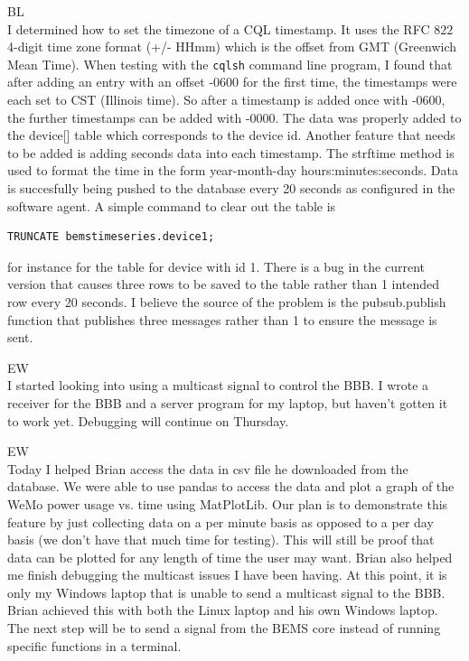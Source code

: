 \documentclass[fontsize=11pt, %
                             paper=letter, %
                             openany, %
                             captions=tableheading,
                             index=totoc,
                             hyperref]{labbook}
\begin{document}
BL\\
I determined how to set the timezone of a CQL timestamp. It uses the RFC $822$ 4-digit time zone format (+/- HHmm) which is the offset from GMT (Greenwich Mean Time). When testing with the \texttt{cqlsh} command line program, I found that after adding an entry with an offset -0600 for the first time, the timestamps were each set to CST (Illinois time). So after a timestamp is added once with -0600, the further timestamps can be added with -0000. The data was properly added to the device[\*] table which corresponds to the device id. Another feature that needs to be added is adding seconds data into each timestamp. The strftime method is used to format the time in the form year-month-day hours:minutes:seconds. Data is succesfully being pushed to the database every 20 seconds as configured in the software agent. A simple command to clear out the table is
\begin{Verbatim}
TRUNCATE bemstimeseries.device1;
\end{Verbatim}
for instance for the table for device with id 1. There is a bug in the current version that causes three rows to be saved to the table rather than 1 intended row every 20 seconds. I believe the source of the problem is the pubsub.publish function that publishes three messages rather than 1 to ensure the message is sent.

EW\\
I started looking into using a multicast signal to control the BBB. I wrote a receiver for the BBB and a server program for my laptop, but haven't gotten it to work yet. Debugging will continue on Thursday.

EW\\
Today I helped Brian access the data in csv file he downloaded from the database. We were able to use pandas to access the data and plot a graph of the WeMo power usage vs. time using MatPlotLib. Our plan is to demonstrate this feature by just collecting data on a per minute basis as opposed to a per day basis (we don't have that much time for testing). This will still be proof that data can be plotted for any length of time the user may want.
Brian also helped me finish debugging the multicast issues I have been having. At this point, it is only my Windows laptop that is unable to send a multicast signal to the BBB. Brian achieved this with both the Linux laptop and his own Windows laptop. The next step will be to send a signal from the BEMS core instead of running specific functions in a terminal.
\end{document}
